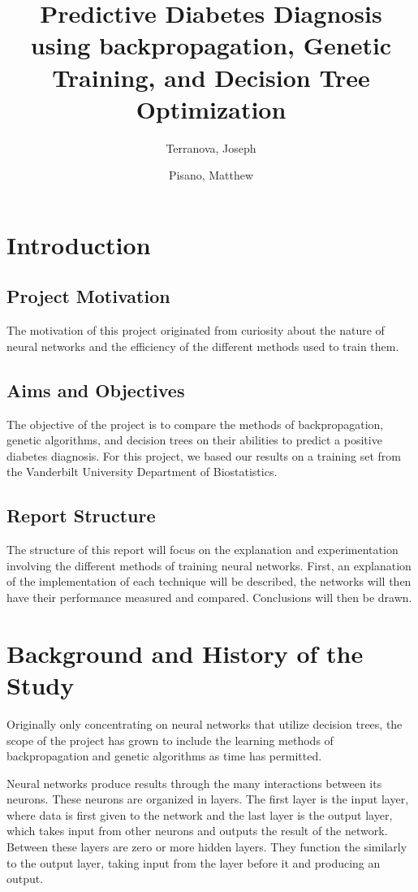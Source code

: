 \documentclass[12pt]{article}
\title{\bf{Predictive Diabetes Diagnosis using backpropagation, 
Genetic Training, and Decision Tree Optimization}}
\author{
    Terranova, Joseph\\
    \and
    Pisano, Matthew\\
}
\date{\DTMusedate{date}}
\begin{document}
\maketitle

\section{Introduction}
    \subsection{Project Motivation}
        The motivation of this project originated from curiosity about the nature of neural 
        networks and the efficiency of the different methods used to train them.
    \subsection{Aims and Objectives}
        The objective of the project is to compare the methods of backpropagation, genetic 
        algorithms, and decision trees on their abilities to predict a positive diabetes diagnosis.  For
        this project, we based our results on a training set from the Vanderbilt University Department of Biostatistics.
    \subsection{Report Structure}
        The structure of this report will focus on the explanation and experimentation involving the
        different methods of training neural networks.  First, an explanation of the implementation of each technique
        will be described, the networks will then have their performance measured and compared.  Conclusions will
        then be drawn.
\section{Background and History of the Study}
    Originally only concentrating on neural networks that utilize decision trees, 
    the scope of the project has grown to include the learning methods of backpropagation and 
    genetic algorithms as time has permitted.
    
    Neural networks produce results through the many interactions 
    between its neurons.  These neurons are organized in layers. The first layer is the input layer, 
    where data is first given to the network and the last layer is the output layer, which takes input 
    from other neurons and outputs the result of the network.  Between these layers are zero or more 
    hidden layers.  They function the similarly to the output layer, taking input from the layer before it 
    and producing an output.
    
\end{document}
